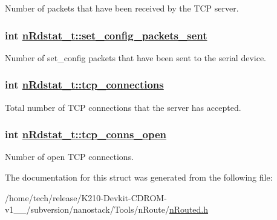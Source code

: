 Number of packets that have been received by the TCP server. \hypertarget{structnRdstat__t_aee0b8cec83aff779e9b6a0062ba6677}{
\subsubsection[set\_\-config\_\-packets\_\-sent]{\setlength{\rightskip}{0pt plus 5cm}int \hyperlink{structnRdstat__t_aee0b8cec83aff779e9b6a0062ba6677}{n\-Rdstat\_\-t::set\_\-config\_\-packets\_\-sent}}}
\label{structnRdstat__t_aee0b8cec83aff779e9b6a0062ba6677}


Number of set\_\-config packets that have been sent to the serial device. \hypertarget{structnRdstat__t_afc21d80b9ea15c65cff7b4cec7973e5}{
\subsubsection[tcp\_\-connections]{\setlength{\rightskip}{0pt plus 5cm}int \hyperlink{structnRdstat__t_afc21d80b9ea15c65cff7b4cec7973e5}{n\-Rdstat\_\-t::tcp\_\-connections}}}
\label{structnRdstat__t_afc21d80b9ea15c65cff7b4cec7973e5}


Total number of TCP connections that the server has accepted. \hypertarget{structnRdstat__t_564faff52a7149d351488516cffbfc35}{
\subsubsection[tcp\_\-conns\_\-open]{\setlength{\rightskip}{0pt plus 5cm}int \hyperlink{structnRdstat__t_564faff52a7149d351488516cffbfc35}{n\-Rdstat\_\-t::tcp\_\-conns\_\-open}}}
\label{structnRdstat__t_564faff52a7149d351488516cffbfc35}


Number of open TCP connections. 

The documentation for this struct was generated from the following file:\begin{CompactItemize}
\item 
/home/tech/release/K210-Devkit-CDROM-v1\_\_/subversion/nanostack/Tools/n\-Route/\hyperlink{nRouted_8h}{n\-Routed.h}\end{CompactItemize}
